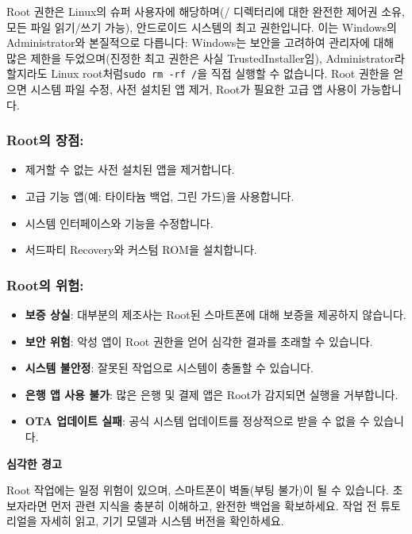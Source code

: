 
Root 권한은 Linux의 슈퍼 사용자에 해당하며(/ 디렉터리에 대한 완전한 제어권 소유, 모든 파일 읽기/쓰기 가능), 안드로이드 시스템의 최고 권한입니다. 이는 Windows의 Administrator와 본질적으로 다릅니다: Windows는 보안을 고려하여 관리자에 대해 많은 제한을 두었으며(진정한 최고 권한은 사실 TrustedInstaller임), Administrator라 할지라도 Linux root처럼\texttt{sudo rm -\allowbreak rf /\allowbreak *}을 직접 실행할 수 없습니다. Root 권한을 얻으면 시스템 파일 수정, 사전 설치된 앱 제거, Root가 필요한 고급 앱 사용이 가능합니다.

\subsubsection*{Root의 장점:}

\begin{itemize}
  \item 제거할 수 없는 사전 설치된 앱을 제거합니다.
  \item 고급 기능 앱(예: 타이타늄 백업, 그린 가드)을 사용합니다.
  \item 시스템 인터페이스와 기능을 수정합니다.
  \item 서드파티 Recovery와 커스텀 ROM을 설치합니다.
\end{itemize}

\subsubsection*{Root의 위험:}

\begin{itemize}
  \item \textbf{보증 상실}: 대부분의 제조사는 Root된 스마트폰에 대해 보증을 제공하지 않습니다.
  \item \textbf{보안 위험}: 악성 앱이 Root 권한을 얻어 심각한 결과를 초래할 수 있습니다.
  \item \textbf{시스템 불안정}: 잘못된 작업으로 시스템이 충돌할 수 있습니다.
  \item \textbf{은행 앱 사용 불가}: 많은 은행 및 결제 앱은 Root가 감지되면 실행을 거부합니다.
  \item \textbf{OTA 업데이트 실패}: 공식 시스템 업데이트를 정상적으로 받을 수 없을 수 있습니다.
\end{itemize}

\textbf{심각한 경고}\par

Root 작업에는 일정 위험이 있으며, 스마트폰이 벽돌(부팅 불가)이 될 수 있습니다. 초보자라면 먼저 관련 지식을 충분히 이해하고, 완전한 백업을 확보하세요. 작업 전 튜토리얼을 자세히 읽고, 기기 모델과 시스템 버전을 확인하세요.

